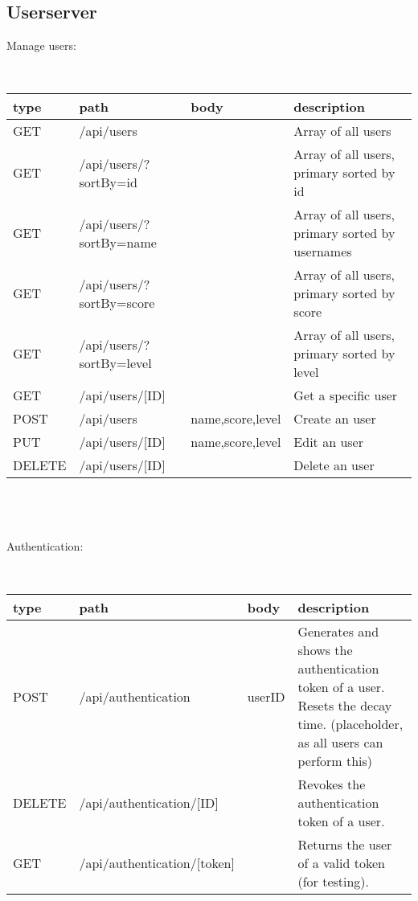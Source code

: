 \subsection{Userserver}
\noindent Manage users:
\begin{small}
\\ \hspace*{-1cm} \begin{tabular}{|p{1.5cm}| p{4.5cm} | p{2.5cm} | p{6cm} |}
    \hline
    type & path & body & description \\ \hline
    GET & /api/users & & Array of all users \\ \hline
    GET & /api/users/?sortBy=id & & Array of all users, primary sorted by id  \\ \hline
    GET & /api/users/?sortBy=name & & Array of all users, primary sorted by usernames  \\ \hline
    GET & /api/users/?sortBy=score & & Array of all users, primary sorted by score  \\ \hline 
    GET & /api/users/?sortBy=level & & Array of all users, primary sorted by level  \\ \hline
    GET & /api/users/[ID] & & Get a specific user  \\ \hline
    POST & /api/users & name,\newline score,\newline level & Create an user  \\ \hline
    PUT & /api/users/[ID] & name,\newline score,\newline level & Edit an user  \\ \hline
    DELETE & /api/users/[ID] & & Delete an user  \\ \hline
   \end{tabular}
\end{small}\\\\\\
\noindent Authentication:
\begin{small}
\\ \hspace*{-1cm} \begin{tabular}{|p{1.5cm}| p{4.5cm} | p{2.5cm} | p{6cm} |}
    \hline
    type & path & body & description \\ \hline
    POST & /api/authentication & userID & Generates and shows the authentication token of a user. Resets the decay time. (placeholder, as all users can perform this)\\ \hline
    DELETE & /api/authentication/[ID] && Revokes the authentication token of a user. \\ \hline
    GET & /api/authentication/[token] && Returns the user of a valid token (for testing). \\ \hline
   \end{tabular}
\end{small}\\\\\\
